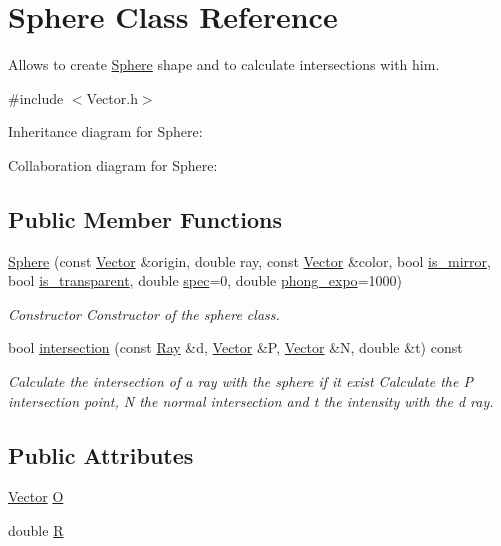 \hypertarget{classSphere}{}\section{Sphere Class Reference}
\label{classSphere}


Allows to create \hyperlink{classSphere}{Sphere} shape and to calculate intersections with him.  




{\ttfamily \#include $<$Vector.\+h$>$}



Inheritance diagram for Sphere\+:


Collaboration diagram for Sphere\+:
\subsection*{Public Member Functions}
\begin{DoxyCompactItemize}
\item 
\hyperlink{classSphere_afe0be46169fd4012f7f5bfe791f8f8c6}{Sphere} (const \hyperlink{classVector}{Vector} \&origin, double ray, const \hyperlink{classVector}{Vector} \&color, bool \hyperlink{classShape_a0ead7657fa5e4c7862fe1cedd670a9e5}{is\+\_\+mirror}, bool \hyperlink{classShape_ab8da3fc4606e66dea941ec23d25f53ef}{is\+\_\+transparent}, double \hyperlink{classShape_a60ef96ac5dea3478fdd1ab320e4c3bef}{spec}=0, double \hyperlink{classShape_a2556fca106f9503e6dfb4da703c28f7f}{phong\+\_\+expo}=1000)
\begin{DoxyCompactList}\small\item\em Constructor Constructor of the sphere class. \end{DoxyCompactList}\item 
bool \hyperlink{classSphere_acbd56a4021638361d354e21d68f98e62}{intersection} (const \hyperlink{classRay}{Ray} \&d, \hyperlink{classVector}{Vector} \&P, \hyperlink{classVector}{Vector} \&N, double \&t) const
\begin{DoxyCompactList}\small\item\em Calculate the intersection of a ray with the sphere if it exist Calculate the P intersection point, N the normal intersection and t the intensity with the d ray. \end{DoxyCompactList}\end{DoxyCompactItemize}
\subsection*{Public Attributes}
\begin{DoxyCompactItemize}
\item 
\hyperlink{classVector}{Vector} \hyperlink{classSphere_a5b1afbcb994e9fd1b369ee4897af94af}{O}
\item 
double \hyperlink{classSphere_ae63beb5380ccbbb9ba820c54d03d02ef}{R}
\end{DoxyCompactItemize}


